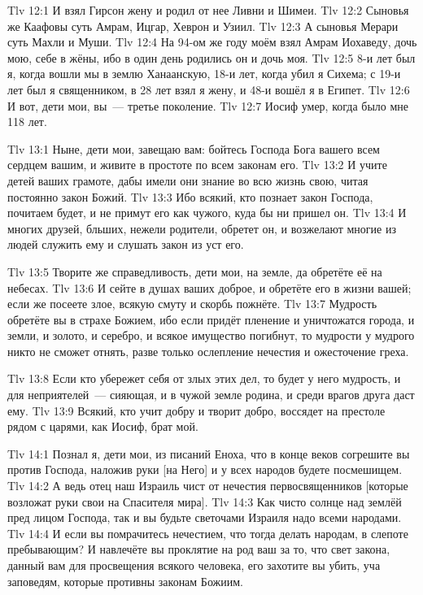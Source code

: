 \vs Tlv 12:1
И взял Гирсон жену и родил от нее Ливни и Шимеи.
\vs Tlv 12:2
Сыновья же Каафовы суть Амрам, Ицгар, Хеврон и Узиил.
\vs Tlv 12:3
А сыновья Мерари суть Махли и Муши.
\vs Tlv 12:4
На 94-ом же году моём взял Амрам Иохаведу,
дочь мою, себе в жёны, ибо в один день родились он и дочь моя.
\vs Tlv 12:5
8-и лет был я, когда вошли мы в землю Ханаанскую,
18-и лет, когда убил я Сихема;
с 19-и лет был я священником,
в 28 лет взял я жену,
и 48-и вошёл я в Египет.
\vs Tlv 12:6
И вот, дети мои, вы~--- третье поколение.
\vs Tlv 12:7
Иосиф умер, когда было мне 118 лет.

\vs Tlv 13:1
Ныне, дети мои, завещаю вам:
бойтесь Господа Бога вашего всем сердцем вашим,
и живите в простоте по всем законам его.
\vs Tlv 13:2
И учите детей ваших грамоте,
дабы имели они знание во всю жизнь свою,
читая постоянно закон Божий.
\vs Tlv 13:3
Ибо всякий, кто познает закон Господа,
почитаем будет, и не примут его как чужого,
куда бы ни пришел он.
\vs Tlv 13:4
И многих друзей, бльших, нежели родители, обретет он,
и возжелают многие из людей служить ему и слушать закон из уст его.

\vs Tlv 13:5
Творите же справедливость, дети мои, на земле, да обретёте её на небесах.
\vs Tlv 13:6
И сейте в душах ваших доброе, и обретёте его в жизни вашей;
если же посеете злое, всякую смуту и скорбь пожнёте.
\vs Tlv 13:7
Мудрость обретёте вы в страхе Божием, ибо если придёт пленение
и уничтожатся города, и земли, и золото, и серебро,
и всякое имущество погибнут,
то мудрости у мудрого никто не сможет отнять,
разве только ослепление нечестия и ожесточение греха.

\vs Tlv 13:8
Если кто убережет себя от злых этих дел,
то будет у него мудрость, и для неприятелей~--- сияющая,
и в чужой земле родина,
и среди врагов друга даст ему.
\vs Tlv 13:9
Всякий, кто учит добру и творит добро,
воссядет на престоле рядом с царями, как Иосиф, брат мой.

\vs Tlv 14:1
Познал я, дети мои, из писаний Еноха,
что в конце веков согрешите вы против Господа,
наложив руки [на Него] и у всех народов будете посмешищем.
\vs Tlv 14:2
А ведь отец наш Израиль чист от нечестия первосвященников
[которые возложат руки свои на Спасителя мира].
\vs Tlv 14:3
Как чисто солнце над землёй пред лицом Господа, так и вы
будьте светочами Израиля надо всеми народами.
\vs Tlv 14:4
И если вы помрачитесь нечестием, что тогда делать народам,
в слепоте пребывающим?
И навлечёте вы проклятие на род ваш за то,
что свет закона, данный вам для просвещения всякого человека,
его захотите вы убить, уча заповедям, которые противны законам Божиим.

